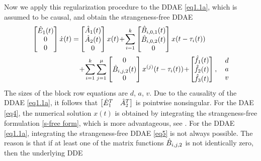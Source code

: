 \documentclass[final,reqno]{siamltex}
\begin{document}
Now we apply this regularization procedure to the DDAE \eqref{eq1.1a}, which is assumed to be causal, and obtain the strangeness-free DDAE
%
%
\begin{equation}\label{eq5}
\begin{aligned}
 \m{\hE_{1}(t) \\ 0 \\ 0} \dot{x}(t) =&
\m{\hA_{1}(t) \\ \hA_{2}(t) \\ 0} x(t) \!+\!
\sum_{i=1}^k \m{\hB_{i,0,1}(t) \\ \hB_{i,0,2}(t) \\ 0} x(t-\tau_i(t))\\&
 \!+\!  \sum_{i=1}^k\sum_{j=1}^{\mu} \m{0 \\ \hB_{i,j,2}(t) \\ 0} x^{(j)}(t-\tau_i(t))
 \!+\! \m{\hf_{1}(t) \\ \hf_{2}(t) \\ \hf_{3}(t)}, \quad \pm{d \\ a \\ v}
\end{aligned}
\end{equation}
The sizes of the block row equations are $d$, $a$, $v$. Due to the causality of the DDAE \eqref{eq1.1a}, it follows that $\begin{bmatrix} \hat{E}^T_1 & \hat{A}^T_2 \end{bmatrix}$ is pointwise 
nonsingular.
For the DAE \eqref{eq4}, the numerical solution $x(t)$ is obtained by integrating the strangeness-free formulation \eqref{s-free form}, which is more 
advantageous, see \cite{KunM96a,KunM96c,KunM06}.
For the DDAE \eqref{eq1.1a}, integrating the strangeness-free DDAE \eqref{eq5} is not always possible. The reason is that if 
at least one of the matrix functions $\hat{B}_{i,j,2}$ is not identically zero, then the underlying DDE 
\end{document}
